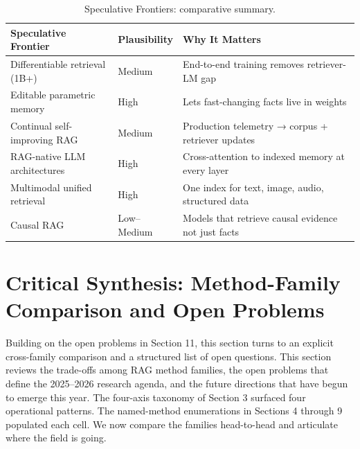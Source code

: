 \documentclass{article}
\begin{document}
\begin{table}[t]
\centering
\caption{Speculative Frontiers: comparative summary.}
\label{tab:speculative-frontiers-2}
\begin{tabular}{>{\raggedright\arraybackslash}p{0.3226\linewidth}
  >{\raggedright\arraybackslash}p{0.1290\linewidth}
  >{\raggedright\arraybackslash}p{0.5484\linewidth}}
\toprule
Speculative Frontier & Plausibility & Why It Matters \\
\midrule
Differentiable retrieval (1B+) & Medium & End-to-end training removes retriever-LM gap \\
Editable parametric memory & High & Lets fast-changing facts live in weights \\
Continual self-improving RAG & Medium & Production telemetry → corpus + retriever updates \\
RAG-native LLM architectures & High & Cross-attention to indexed memory at every layer \\
Multimodal unified retrieval & High & One index for text, image, audio, structured data \\
Causal RAG & Low--Medium & Models that retrieve causal evidence not just facts \\
\end{tabular}
\end{table}

\section{Critical Synthesis: Method-Family Comparison and Open Problems}\label{critical-synthesis-method-family-comparison-and-open-problems}

Building on the open problems in Section 11, this section turns to an explicit cross-family comparison and a structured list of open questions. This section reviews the trade-offs among RAG method families, the open problems that define the 2025--2026 research agenda, and the future directions that have begun to emerge this year. The four-axis taxonomy of Section 3 surfaced four operational patterns. The named-method enumerations in Sections 4 through 9 populated each cell. We now compare the families head-to-head and articulate where the field is going.
\end{document}

